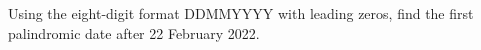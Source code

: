 Using the eight-digit format DDMMYYYY with leading zeros, find the first palindromic date after 22 February 2022.

